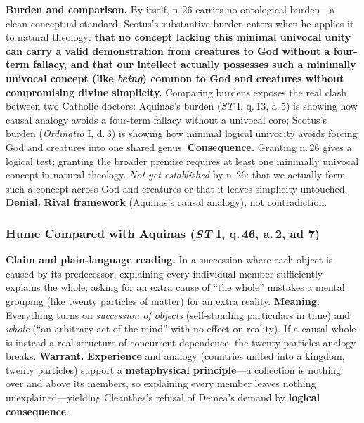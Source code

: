 \textbf{Burden and comparison.} By itself, n.\,26 carries no ontological burden---a clean conceptual standard. Scotus's substantive burden enters when he applies it to natural theology: \textbf{that no concept lacking this minimal univocal unity can carry a valid demonstration from creatures to God without a four-term fallacy, and that our intellect actually possesses such a minimally univocal concept (like \emph{being}) common to God and creatures without compromising divine simplicity.} Comparing burdens exposes the real clash between two Catholic doctors: Aquinas's burden (\emph{ST} I, q.\,13, a.\,5) is showing how causal analogy avoids a four-term fallacy without a univocal core; Scotus's burden (\emph{Ordinatio} I, d.\,3) is showing how minimal logical univocity avoids forcing God and creatures into one shared genus. \textbf{Consequence.} Granting n.\,26 gives a logical test; granting the broader premise requires at least one minimally univocal concept in natural theology. \emph{Not yet established} by n.\,26: that we actually form such a concept across God and creatures or that it leaves simplicity untouched. \textbf{Denial.} \textbf{Rival framework} (Aquinas's causal analogy), not contradiction.

\subsubsection*{Hume Compared with Aquinas (\emph{ST} I, q.\,46, a.\,2, ad 7)}

\textbf{Claim and plain-language reading.} In a succession where each object is caused by its predecessor, explaining every individual member sufficiently explains the whole; asking for an extra cause of ``the whole'' mistakes a mental grouping (like twenty particles of matter) for an extra reality. \textbf{Meaning.} Everything turns on \emph{succession of objects} (self-standing particulars in time) and \emph{whole} (``an arbitrary act of the mind'' with no effect on reality). If a causal whole is instead a real structure of concurrent dependence, the twenty-particles analogy breaks. \textbf{Warrant.} \textbf{Experience} and analogy (countries united into a kingdom, twenty particles) support a \textbf{metaphysical principle}---a collection is nothing over and above its members, so explaining every member leaves nothing unexplained---yielding Cleanthes's refusal of Demea's demand by \textbf{logical consequence}.

